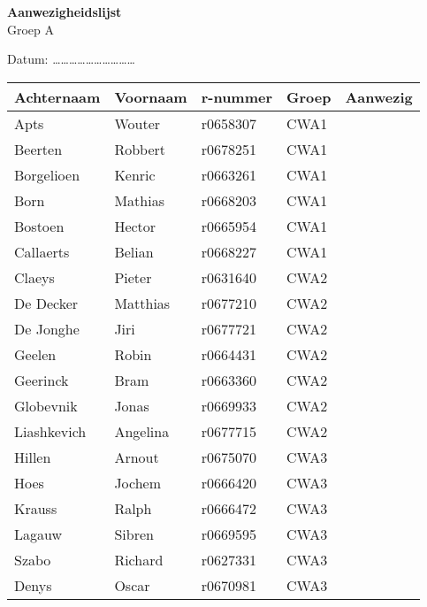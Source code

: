 \documentclass[12pt,a4paper]{article}
\begin{document}
\pagestyle{empty}

\begin{center}
	\begin{Large}
		\textbf{Aanwezigheidslijst}\\[0.5cm]%
		Groep A
	\end{Large}
	
	\vspace*{1cm}
	
	Datum: \ldots\ldots\ldots\ldots\ldots\ldots\ldots\ldots\ldots\ldots
\end{center}

\begin{table}[!h]
\centering
\begin{tabular}{m{3cm}m{2.5cm}m{2cm}m{2cm}m{3cm}}
\toprule[1pt]
\textbf{Achternaam} & \textbf{Voornaam} & \textbf{r-nummer} & \textbf{Groep} & \textbf{Aanwezig} \\
\midrule[1pt]
Apts & Wouter & r0658307 & CWA1 \\
\midrule
Beerten & Robbert & r0678251 & CWA1\\
\midrule
Borgelioen & Kenric & r0663261 & CWA1\\
\midrule
Born & Mathias & r0668203 & CWA1\\
\midrule
Bostoen & Hector & r0665954& CWA1\\
\midrule
Callaerts & Belian & r0668227& CWA1\\
\midrule[1pt]
Claeys & Pieter & r0631640& CWA2\\
\midrule
De Decker & Matthias & r0677210& CWA2\\
\midrule
De Jonghe & Jiri & r0677721& CWA2\\
\midrule
Geelen & Robin & r0664431& CWA2\\
\midrule
Geerinck & Bram & r0663360& CWA2\\
\midrule
Globevnik & Jonas & r0669933& CWA2\\
\midrule
Liashkevich & Angelina & r0677715 & CWA2\\
\midrule[1pt]
Hillen & Arnout & r0675070& CWA3\\
\midrule
Hoes & Jochem & r0666420& CWA3\\
\midrule
Krauss & Ralph & r0666472& CWA3\\
\midrule
Lagauw & Sibren & r0669595& CWA3\\
\midrule
Szabo & Richard & r0627331& CWA3\\
\midrule
Denys & Oscar &  r0670981 & CWA3\\
\bottomrule[1pt]
\end{tabular}
\end{table}
\end{document}
